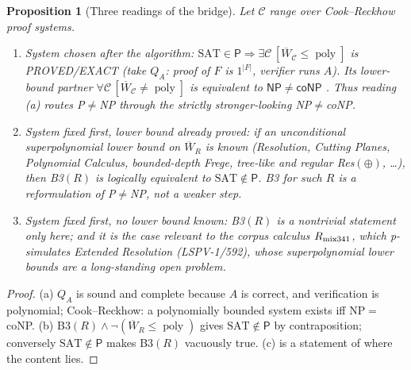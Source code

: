 \documentclass[11pt]{article}
\newtheorem{proposition}{Proposition}
\newcommand{\W}{\overline W}
\newcommand{\poly}{\operatorname{poly}}
\begin{document}
\begin{proposition}[Three readings of the bridge]\label{prop:readings}
Let $\mathcal{C}$ range over Cook--Reckhow proof systems.
\begin{enumerate}
\item[(a)] \emph{System chosen after the algorithm:}
$\mathrm{SAT}\in\mathsf P\Rightarrow\exists\mathcal C\,[\W_{\mathcal C}\le\poly]$
is PROVED/EXACT (take $Q_A$: proof of $F$ is $1^{|F|}$, verifier runs $A$).
Its lower-bound partner $\forall\mathcal C\,[\W_{\mathcal C}\ne\poly]$ is
equivalent to $\mathsf{NP}\neq\mathsf{coNP}$ \cite{cookreckhow1979}.
Thus reading (a) routes P$\neq$NP through the strictly stronger-looking
NP$\neq$coNP.
\item[(b)] \emph{System fixed first, lower bound already proved:}
if an unconditional superpolynomial lower bound on $\W_R$ is known
(Resolution, Cutting Planes, Polynomial Calculus, bounded-depth Frege,
tree-like and regular Res$(\oplus)$, \ldots), then B3$(R)$ is logically
equivalent to $\mathrm{SAT}\notin\mathsf P$. B3 for such $R$ is a reformulation
of P$\neq$NP, not a weaker step.
\item[(c)] \emph{System fixed first, no lower bound known:}
B3$(R)$ is a nontrivial statement only here; and it is the case relevant to
the corpus calculus $R_{\rm mix341}$, which p-simulates Extended Resolution
(LSPV-1/592), whose superpolynomial lower bounds are a long-standing open
problem.
\end{enumerate}
\end{proposition}
\begin{proof}
(a) $Q_A$ is sound and complete because $A$ is correct, and verification is
polynomial; Cook--Reckhow: a polynomially bounded system exists iff
NP$=$coNP. (b) B3$(R)\wedge\neg(\W_R\le\poly)$ gives $\mathrm{SAT}\notin\mathsf P$
by contraposition; conversely $\mathrm{SAT}\notin\mathsf P$ makes B3$(R)$
vacuously true. (c) is a statement of where the content lies.
\end{proof}
\end{document}
